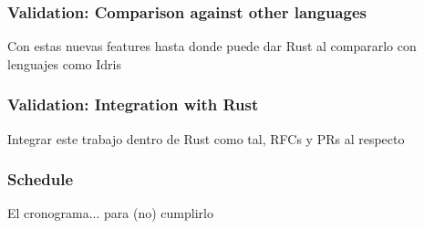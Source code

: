 \documentclass{beamer}
\begin{document}
\begin{frame}[fragile]
    \frametitle{Validation: Comparison against other languages}
    Con estas nuevas features hasta donde puede dar Rust al compararlo con lenguajes como Idris
\end{frame}

\begin{frame}[fragile]
    \frametitle{Validation: Integration with Rust}
    Integrar este trabajo dentro de Rust como tal, RFCs y PRs al respecto
\end{frame}

\begin{frame}[fragile]
    \frametitle{Schedule}
    El cronograma... para (no) cumplirlo
\end{frame}
\end{document}
